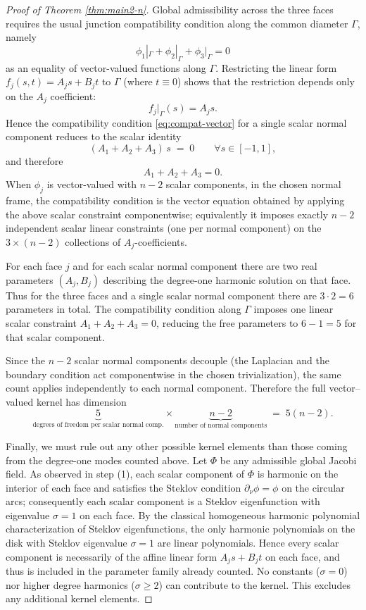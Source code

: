 \documentclass[11pt]{amsart}
\numberwithin{equation}{section}
\theoremstyle{theorem}
\theoremstyle{definition}
\numberwithin{equation}{section}
\begin{document}
\begin{proof}[Proof of Theorem \ref{thm:main2-n}]
Global admissibility across the three faces requires the usual junction compatibility condition along the common diameter $\Gamma$, namely
\begin{equation}\label{eq:compat-vector}
\phi_1|_{\Gamma} + \phi_2|_{\Gamma} + \phi_3|_{\Gamma} = 0
\end{equation}
as an equality of vector-valued functions along $\Gamma$.  Restricting the linear form $f_j(s,t)=A_j s + B_j t$ to $\Gamma$ (where $t\equiv0$) shows that the restriction depends only on the $A_j$ coefficient:
\[
f_j|_{\Gamma}(s) = A_j s.
\]
Hence the compatibility condition \eqref{eq:compat-vector} for a single scalar normal component reduces to the scalar identity
\[
(A_1 + A_2 + A_3)\, s \;=\; 0 \qquad\forall s\in[-1,1],
\]
and therefore
\[
A_1 + A_2 + A_3 = 0.
\]
When $\phi_j$ is vector-valued with $n-2$ scalar components, in the chosen normal frame, the compatibility condition is the vector equation obtained by applying the above scalar constraint componentwise; equivalently it imposes exactly $n-2$ independent scalar linear constraints (one per normal component) on the $3\times (n-2)$ collections of $A_j$-coefficients.
\medskip


For each face $j$ and for each scalar normal component there are two real parameters $(A_j,B_j)$ describing the degree-one harmonic solution on that face.  Thus for the three faces and a single scalar normal component there are $3\cdot 2=6$ parameters in total.  The compatibility condition along $\Gamma$ imposes one linear scalar constraint $A_1+A_2+A_3=0$, reducing the free parameters to $6-1=5$ for that scalar component.

Since the $n-2$ scalar normal components decouple (the Laplacian and the boundary condition act componentwise in the chosen trivialization), the same count applies independently to each normal component.  Therefore the full vector--valued kernel has dimension
\[
\underbrace{5}_{\text{degrees of freedom per scalar normal comp.}}\times \underbrace{n-2}_{\text{number of normal components}} \;=\; 5(n-2).
\]
\medskip


Finally, we must rule out any other possible kernel elements than those coming from the degree-one modes counted above.  Let $\Phi$ be any admissible global Jacobi field.  As observed in step (1), each scalar component of $\Phi$ is harmonic on the interior of each face and satisfies the Steklov condition $\partial_\nu \phi = \phi$ on the circular arcs; consequently each scalar component is a Steklov eigenfunction with eigenvalue $\sigma=1$ on each face.  By the classical homogeneous harmonic polynomial characterization of Steklov eigenfunctions, the only harmonic polynomials on the disk with Steklov eigenvalue $\sigma=1$ are linear polynomials.  Hence every scalar component is necessarily of the affine linear form $A_j s + B_j t$ on each face, and thus is included in the parameter family already counted.  No constants ($\sigma=0$) nor higher degree harmonics ($\sigma\ge2$) can contribute to the kernel.  This excludes any additional kernel elements.


\end{proof}
\end{document}
